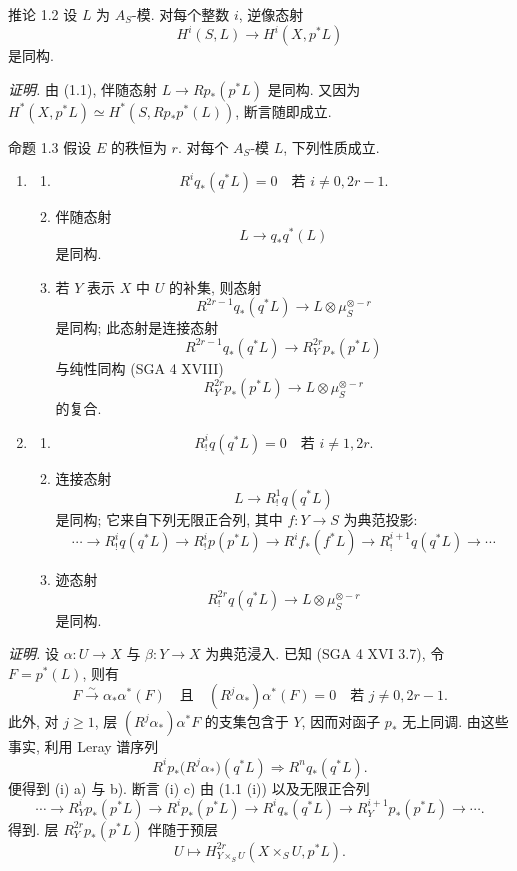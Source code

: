 \begin{statement}{推论 1.2}
设 $L$ 为 $A_S$-模. 对每个整数 $i$, 逆像态射
\[
H^i(S,L)\longrightarrow H^i(X,p^*L)
\]
是同构.
\end{statement}

\emph{证明.} 由 (1.1), 伴随态射 $L\to Rp_*(p^*L)$ 是同构. 又因为 $H^*(X,p^*L)\simeq H^*(S,Rp_*p^*(L))$, 断言随即成立.

\begin{statement}{命题 1.3}
假设 $E$ 的秩恒为 $r$. 对每个 $A_S$-模 $L$, 下列性质成立.
\begin{enumerate}[label=(\roman*)]
\item
\begin{enumerate}[label=\alph*)]
\item
\[
R^i q_*(q^*L)=0\quad\text{若 }i\ne 0,2r-1.
\]
\item 伴随态射
\[
L\longrightarrow q_*q^*(L)
\]
是同构.
\item 若 $Y$ 表示 $X$ 中 $U$ 的补集, 则态射
\[
R^{2r-1}q_*(q^*L)\longrightarrow L\otimes\mu_S^{\otimes -r}
\]
是同构; 此态射是连接态射
\[
R^{2r-1}q_*(q^*L)\longrightarrow R_Y^{2r}p_*(p^*L)
\tag{1}
\]
与纯性同构 (SGA 4 XVIII)
\[
R_Y^{2r}p_*(p^*L)\longrightarrow L\otimes\mu_S^{\otimes -r}
\]
的复合.
\end{enumerate}
\item
\begin{enumerate}[label=\alph*)]
\item
\[
R_!^i q(q^*L)=0\quad\text{若 }i\ne 1,2r.
\]
\item 连接态射
\[
L\longrightarrow R_!^1 q(q^*L)
\]
是同构; 它来自下列无限正合列, 其中 $f:Y\to S$ 为典范投影:
\[
\cdots\longrightarrow R_!^i q(q^*L)\longrightarrow R_!^i p(p^*L)
\longrightarrow R^i f_*(f^*L)\longrightarrow R_!^{i+1}q(q^*L)\longrightarrow\cdots
\]

\item 迹态射
\[
R_!^{2r}q(q^*L)\longrightarrow L\otimes\mu_S^{\otimes -r}
\]
是同构.
\end{enumerate}
\end{enumerate}
\end{statement}

\emph{证明.} 设 $\alpha:U\to X$ 与 $\beta:Y\to X$ 为典范浸入. 已知 (SGA 4 XVI 3.7), 令 $F=p^*(L)$, 则有
\[
F\xrightarrow{\sim}\alpha_*\alpha^*(F)
\quad\text{且}\quad
(R^j\alpha_*)\alpha^*(F)=0\quad\text{若 }j\ne0,2r-1.
\]
此外, 对 $j\ge1$, 层 $(R^j\alpha_*)\alpha^*F$ 的支集包含于 $Y$, 因而对函子 $p_*$ 无上同调. 由这些事实, 利用 Leray 谱序列
\[
R^i p_*\bigl(R^j\alpha_*\bigr)(q^*L)\Longrightarrow R^n q_*(q^*L).
\]
便得到 (i) a) 与 b). 断言 (i) c) 由 (1.1 (i)) 以及无限正合列
\[
\cdots\longrightarrow R_Y^i p_*(p^*L)\longrightarrow R^i p_*(p^*L)\longrightarrow R^i q_*(q^*L)
\longrightarrow R_Y^{i+1}p_*(p^*L)\longrightarrow\cdots.
\]
得到. 层 $R_Y^{2r}p_*(p^*L)$ 伴随于预层
\[
U\longmapsto H^{2r}_{Y\times_S U}(X\times_S U,p^*L).
\]

